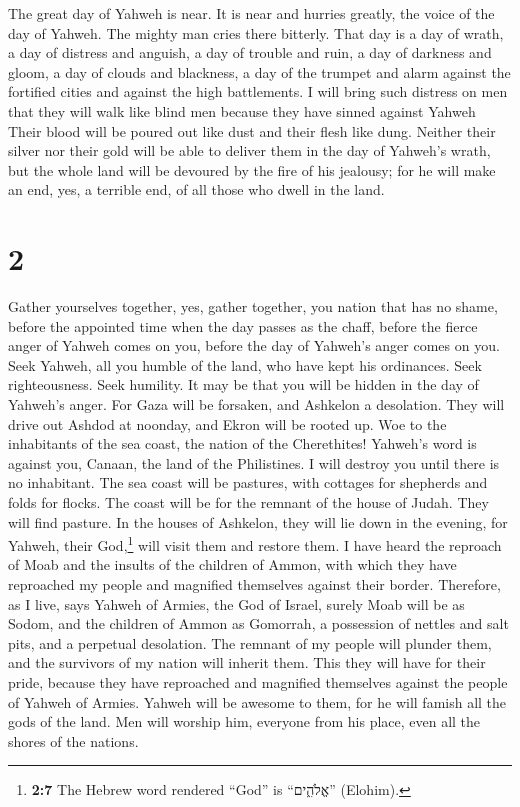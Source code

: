  The great day of Yahweh is near. It is near and hurries
greatly, the voice of the day of Yahweh. The mighty man cries there
bitterly.  That day is a day of wrath, a day of distress
and anguish, a day of trouble and ruin, a day of darkness and gloom, a
day of clouds and blackness,  a day of the trumpet and
alarm against the fortified cities and against the high battlements.
 I will bring such distress on men that they will walk
like blind men because they have sinned against Yahweh Their blood will
be poured out like dust and their flesh like dung. 
Neither their silver nor their gold will be able to deliver them in the
day of Yahweh's wrath, but the whole land will be devoured by the fire
of his jealousy; for he will make an end, yes, a terrible end, of all
those who dwell in the land.

\hypertarget{section-1}{%
\section{2}\label{section-1}}

 Gather yourselves together, yes, gather together, you
nation that has no shame,  before the appointed time when
the day passes as the chaff, before the fierce anger of Yahweh comes on
you, before the day of Yahweh's anger comes on you.  Seek
Yahweh, all you humble of the land, who have kept his ordinances. Seek
righteousness. Seek humility. It may be that you will be hidden in the
day of Yahweh's anger.  For Gaza will be forsaken, and
Ashkelon a desolation. They will drive out Ashdod at noonday, and Ekron
will be rooted up.  Woe to the inhabitants of the sea
coast, the nation of the Cherethites! Yahweh's word is against you,
Canaan, the land of the Philistines. I will destroy you until there is
no inhabitant.  The sea coast will be pastures, with
cottages for shepherds and folds for flocks.  The coast
will be for the remnant of the house of Judah. They will find pasture.
In the houses of Ashkelon, they will lie down in the evening, for
Yahweh, their God,\footnote{\textbf{2:7} The Hebrew word rendered
  ``God'' is ``אֱלֹהִ֑ים'' (Elohim).} will visit them and restore them.
 I have heard the reproach of Moab and the insults of the
children of Ammon, with which they have reproached my people and
magnified themselves against their border.  Therefore, as
I live, says Yahweh of Armies, the God of Israel, surely Moab will be as
Sodom, and the children of Ammon as Gomorrah, a possession of nettles
and salt pits, and a perpetual desolation. The remnant of my people will
plunder them, and the survivors of my nation will inherit them.
 This they will have for their pride, because they have
reproached and magnified themselves against the people of Yahweh of
Armies.  Yahweh will be awesome to them, for he will
famish all the gods of the land. Men will worship him, everyone from his
place, even all the shores of the nations.


